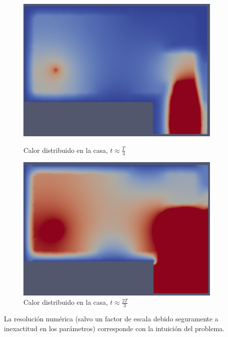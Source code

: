 \documentclass[12pt,paperletter]{article}
\begin{document}
\begin{figure}[H]
    \centering
    \begin{minipage}{0.45\textwidth}
        \centering
        \includegraphics[width=0.9\textwidth]{casa1.PNG} %
        \caption{Calor distribuido en la casa, $t\approx \frac{T}{3}$}
    \end{minipage}\hfill
    \begin{minipage}{0.45\textwidth}
        \centering
        \includegraphics[width=0.9\textwidth]{casa2.PNG} %
        \caption{Calor distribuido en la casa, $t\approx \frac{2T}{3}$}
    \end{minipage}
\end{figure}

La resolución numérica (salvo un factor de escala debido seguramente a inexactitud en los parámetros) corresponde con la intuición del problema.
\end{document}
